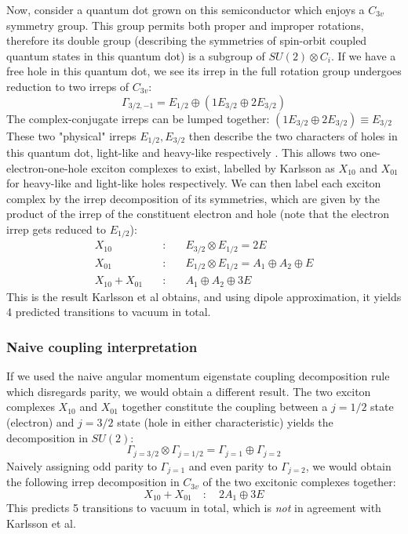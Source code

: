 \documentclass[12pt]{article}
\begin{document}
	Now, consider a quantum dot grown on this semiconductor which enjoys a $C_{3v}$ symmetry group. This group permits both proper and improper rotations, therefore its double group (describing the symmetries of spin-orbit coupled quantum states in this quantum dot) is a subgroup of $SU(2)\otimes C_i$. If we have a free hole in this quantum dot, we see its irrep in the full rotation group undergoes reduction to two irreps of $C_{3v}$:
	$$\Gamma_{3/2,-1}=E_{1/2}\oplus (1E_{3/2}\oplus 2E_{3/2})$$
	The complex-conjugate irreps can be lumped together: $(1E_{3/2}\oplus 2E_{3/2})\equiv E_{3/2}$
	These two "physical" irreps $E_{1/2}, E_{3/2}$ then describe the two characters of holes in this quantum dot, light-like and heavy-like respectively \cite{karlsson}. This allows two one-electron-one-hole exciton complexes to exist, labelled by Karlsson as $X_{10}$ and $X_{01}$ for heavy-like and light-like holes respectively. We can then label each exciton complex by the irrep decomposition of its symmetries, which are given by the product of the irrep of the constituent electron and hole (note that the electron irrep gets reduced to $E_{1/2}$):
	\begin{eqnarray*}
	X_{10}\quad &:& \quad E_{3/2} \otimes E_{1/2} = 2E\\
	X_{01}\quad &:& \quad E_{1/2} \otimes E_{1/2} = A_1 \oplus A_2 \oplus E\\
	X_{10} + X_{01} \quad &:& \quad A_1 \oplus A_2 \oplus 3E
	\end{eqnarray*}
	This is the result Karlsson et al obtains, and using dipole approximation, it yields 4 predicted transitions to vacuum in total.
	\subsubsection{Naive coupling interpretation}
	If we used the naive angular momentum eigenstate coupling decomposition rule which disregards parity, we would obtain a different result. The two exciton complexes $X_{10}$ and $X_{01}$ together constitute the coupling between a $j=1/2$ state (electron) and $j=3/2$ state (hole in either characteristic) yields the decomposition in $SU(2)$:
	$$\Gamma_{j=3/2}\otimes \Gamma_{j=1/2} = \Gamma_{j=1}\oplus \Gamma_{j=2}$$
	Naively assigning odd parity to $\Gamma_{j=1}$ and even parity to $\Gamma_{j=2}$, we would obtain the following irrep decomposition in $C_{3v}$ of the two excitonic complexes together:
	$$X_{10} + X_{01} \quad : \quad 2A_1 \oplus 3E$$
	This predicts 5 transitions to vacuum in total, which is \textit{not} in agreement with Karlsson et al.
	
\end{document}
